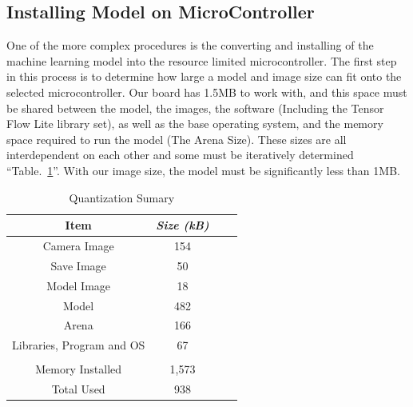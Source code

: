 \documentclass[conference]{IEEEtran}
\begin{document}
\subsection{Installing Model on MicroController}
One of the more complex procedures is the converting and installing of the machine learning model into the resource limited microcontroller. The first step in this process is to determine how large a model and image size can fit onto the selected microcontroller. Our board has 1.5MB to work with, and this space must be shared between the model, the images, the software (Including the Tensor Flow Lite library set), as well as the base operating system, and the memory space required to run the model (The Arena Size).  These sizes are all interdependent on each other and some must be iteratively determined ``Table.~\ref{memUse}''. With our image size, the model must be significantly less than 1MB.
\begin{table}[htbp]
\caption{Quantization Sumary}
\begin{center}
\begin{tabular}{|c|c|c|c|}
\hline
\textbf{Item} & \textbf{\textit{Size (kB)}}    \\ \hline 
	Camera Image & 154\\ \hline
	Save Image & 50\\ \hline
	Model Image &  18 \\ \hline 
	Model& 482 \\ \hline 
	Arena& 166 \\ \hline 
	Libraries, Program and OS & 67\\ \hline 
	 & \\ \hline
	 Memory Installed & 1,573 \\ \hline
	 Total Used& 938 \\ \hline
\end{tabular}
\label{memUse}
\end{center}
\end{table}
\end{document}
